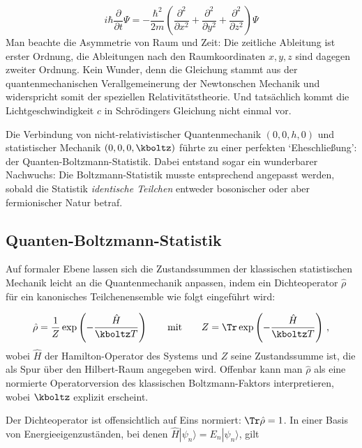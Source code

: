 \documentclass{scrartcl}
\begin{document}
\begin{equation*}\label{eq:schroedinger}
  i\hbar\frac{\partial}{\partial t}\Psi=-\frac{\hbar^2}{2m}(\frac{\partial^2}{\partial x^2}+\frac{\partial^2}{\partial y^2}+\frac{\partial^2}{\partial z^2})\Psi
\end{equation*}
%
Man beachte die Asymmetrie von Raum und Zeit: Die zeitliche Ableitung ist erster Ordnung, die Ableitungen nach den Raumkoordinaten $x,y,z$ sind dagegen zweiter Ordnung. Kein Wunder, denn die Gleichung stammt aus der quantenmechanischen Verallgemeinerung der Newtonschen Mechanik und widerspricht somit der speziellen Relativitätstheorie. Und tatsächlich kommt die Lichtgeschwindigkeit $c$ in Schrödingers Gleichung nicht einmal vor.


\newpage {}
\label{sec:0011}

Die Verbindung von nicht-relativistischer Quantenmechanik $(0,0,h,0)$ und statistischer Mechanik $(0,0,0,\kboltz)$ führte zu einer perfekten \enquote*{Eheschließung}: der Quanten-Boltzmann-Statistik. Dabei entstand sogar ein wunderbarer Nachwuchs: Die Boltzmann-Statistik musste entsprechend angepasst werden, sobald die Statistik \emph{identische Teilchen} entweder bosonischer oder aber fermionischer Natur betraf.


\subsection*{Quanten-Boltzmann-Statistik}

Auf formaler Ebene lassen sich die Zustandssummen der klassischen statistischen Mechanik leicht an die Quantenmechanik anpassen, indem ein Dichteoperator $\hat\rho$ für ein kanonisches Teilchenensemble wie folgt eingeführt wird:

\begin{equation*}
  \hat \rho=\frac{1}{Z} \exp\left(-\frac{\hat H}{\kboltz T}\right)
    \qquad \textrm{mit} \qquad
    Z=\Tr \exp\left(-\frac{\hat H}{\kboltz T}\right)\,,
\end{equation*}
%
wobei $\hat H$ der Hamilton-Operator des Systems und $Z$ seine Zustandssumme ist, die als Spur über den Hilbert-Raum angegeben wird. Offenbar kann man $\hat\rho$ als eine normierte Operatorversion des klassischen Boltzmann-Faktors interpretieren, wobei $\kboltz$ explizit erscheint.

Der Dichteoperator ist offensichtlich auf Eins normiert: $\Tr \hat \rho=1$. In einer Basis von Energieeigenzuständen, bei denen $\hat H |\psi_n\rangle=E_n |\psi_n\rangle$, gilt
\end{document}
